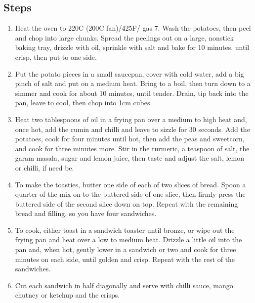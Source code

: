 \documentclass{book}
\begin{document}
\subsection*{Steps}
\begin{enumerate}
\item Heat the oven to 220C (200C fan)/425F/ gas 7. Wash the potatoes, then peel and chop into large chunks. Spread the peelings out on a large, nonstick baking tray, drizzle with oil, sprinkle with salt and bake for 10 minutes, until crisp, then put to one side.
\item Put the potato pieces in a small saucepan, cover with cold water, add a big pinch of salt and put on a medium heat. Bring to a boil, then turn down to a simmer and cook for about 10 minutes, until tender. Drain, tip back into the pan, leave to cool, then chop into 1cm cubes.
\item Heat two tablespoons of oil in a frying pan over a medium to high heat and, once hot, add the cumin and chilli and leave to sizzle for 30 seconds. Add the potatoes, cook for four minutes until hot, then add the peas and sweetcorn, and cook for three minutes more. Stir in the turmeric, a teaspoon of salt, the garam masala, sugar and lemon juice, then taste and adjust the salt, lemon or chilli, if need be.
\item To make the toasties, butter one side of each of two slices of bread. Spoon a quarter of the mix on to the buttered side of one slice, then firmly press the buttered side of the second slice down on top. Repeat with the remaining bread and filling, so you have four sandwiches.
\item To cook, either toast in a sandwich toaster until bronze, or wipe out the frying pan and heat over a low to medium heat. Drizzle a little oil into the pan and, when hot, gently lower in a sandwich or two and cook for three minutes on each side, until golden and crisp. Repeat with the rest of the sandwiches.
\item Cut each sandwich in half diagonally and serve with chilli sauce, mango chutney or ketchup and the crisps.
\end{enumerate}
\newpage
\end{document}
